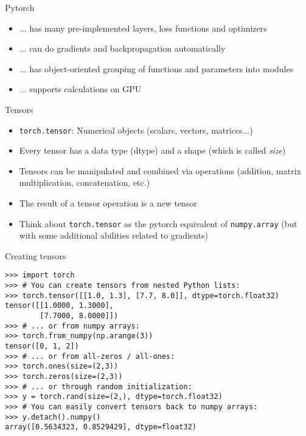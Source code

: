 \begin{vbframe}{Pytorch}

	\vfill
	\begin{itemize} 
		\item ... has many pre-implemented layers, loss functions and optimizers
		\item ... can do gradients and backpropagation automatically
		\item ... has object-oriented grouping of functions and parameters into modules
		\item ... supports calculations on GPU
	   \end{itemize}
	   
	

\vfill

\end{vbframe}


\begin{vbframe}{Tensors}

	\vfill
	\begin{itemize}
		\item \texttt{torch.tensor}: Numerical objects (scalars, vectors, matrices...)
		 \item Every tensor has a data type (dtype) and a shape (which is called \textit{size})
		\item Tensors can be manipulated and combined via operations (addition, matrix multiplication, concatenation, etc.)
		\item The result of a tensor operation is a new tensor
		\item Think about \texttt{torch.tensor} as the pytorch equivalent of \texttt{numpy.array} (but with some additional abilities related to gradients)
	   \end{itemize}
	   
\vfill

\end{vbframe}


\begin{frame}[fragile]{Creating tensors}
\vfill
\begin{verbatim}
>>> import torch
>>> # You can create tensors from nested Python lists:
>>> torch.tensor([[1.0, 1.3], [7.7, 8.0]], dtype=torch.float32)
tensor([[1.0000, 1.3000],
		[7.7000, 8.0000]])
>>> # ... or from numpy arrays:
>>> torch.from_numpy(np.arange(3))
tensor([0, 1, 2])
>>> # ... or from all-zeros / all-ones:
>>> torch.ones(size=(2,3))
>>> torch.zeros(size=(2,3))
>>> # ... or through random initialization:
>>> y = torch.rand(size=(2,), dtype=torch.float32)
>>> # You can easily convert tensors back to numpy arrays:
>>> y.detach().numpy()
array([0.5634323, 0.8529429], dtype=float32)
\end{verbatim}
		   
\vfill

\end{frame}

